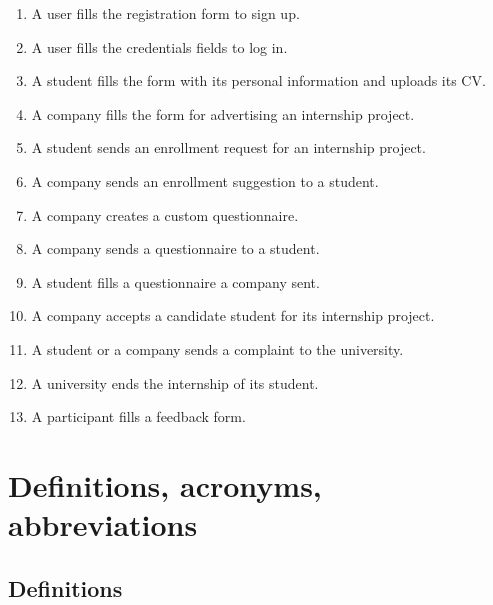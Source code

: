 \begin{enumerate}[label=\textbf{SP\arabic* -}]
    \item A user fills the registration form to sign up.
    \item A user fills the credentials fields to log in.
    \item A student fills the form with its personal information and uploads its CV.
    \item A company fills the form for advertising an internship project.
    \item A student sends an enrollment request for an internship project.
    \item A company sends an enrollment suggestion to a student.
    \item A company creates a custom questionnaire.
    \item A company sends a questionnaire to a student.
    \item A student fills a questionnaire a company sent.
    \item A company accepts a candidate student for its internship project.
    \item A student or a company sends a complaint to the university.
    \item A university ends the internship of its student.
    \item A participant fills a feedback form.

\end{enumerate}

\section{Definitions, acronyms, abbreviations}

\subsection{Definitions}

